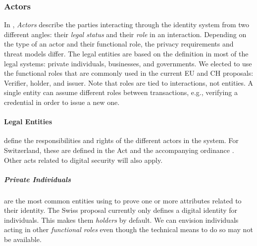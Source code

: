 \subsubsection{Actors}
\label{subsub:actors}

In \emph{\rot}, \emph{Actors} describe the parties interacting through the identity system from two different angles: their \emph{legal status} and their \emph{role} in an interaction.
Depending on the type of an actor and their functional role, the privacy requirements and threat models differ.
The legal entities are based on the definition in most of the legal systems: private individuals, businesses, and governments.
We elected to use the functional roles that are commonly used in the current EU and CH proposals: Verifier, holder, and issuer.
Note that roles are tied to interactions, not entities. 
A single entity can assume different roles between transactions, e.g., verifying a credential in order to issue a new one.


\vspace{1em}


\paragraph{Legal Entities} define the responsibilities and rights of the different actors in the system.
For Switzerland, these are defined in the \eid Act \cite{BGEID24} and the accompanying ordinance \cite{VEID25}.
Other acts related to digital security will also apply.

\subparagraph{Private Individuals}
are the most common entities using \eid to prove one or more attributes related to their identity.
The Swiss proposal currently only defines a digital identity for individuals.
This makes them \emph{holders} by default. We can envision individuals acting in other \emph{functional roles} even though the technical means to do so may not be available.

